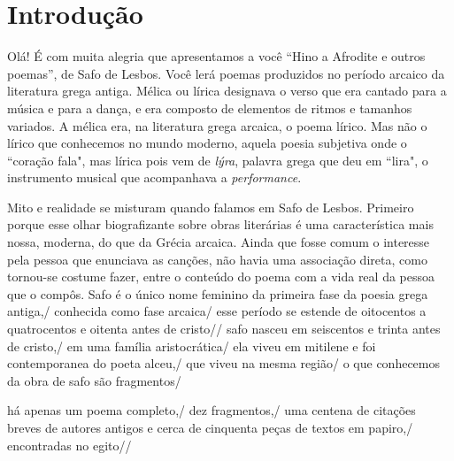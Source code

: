 \documentclass[12pt]{extarticle}
\begin{document}
\section{Introdução}

Olá! 
É com muita alegria que apresentamos a você “Hino a Afrodite e outros poemas”, 
de Safo de Lesbos. 
Você lerá poemas produzidos no período arcaico da literatura grega antiga.
Mélica ou lírica designava o verso que era cantado para a música e para a 
dança, e era composto de elementos de ritmos e tamanhos variados. A mélica era, 
na literatura grega arcaica, o poema lírico. Mas não o lírico que conhecemos no
mundo moderno, aquela poesia subjetiva onde o ``coração fala", mas lírica
pois vem de \textit{lýra}, palavra grega que deu em ``lira", o instrumento musical
que acompanhava a \textit{performance}.

Mito e realidade se misturam quando falamos em Safo de Lesbos. Primeiro porque
esse olhar biografizante sobre obras literárias é uma característica mais nossa,
moderna, do que da Grécia arcaica. Ainda que fosse comum o interesse pela pessoa
que enunciava as canções, não havia uma associação direta, como tornou-se costume
fazer, entre o conteúdo do poema com a vida real da pessoa que o compôs.
Safo é o único nome feminino da primeira fase da poesia grega antiga,/ conhecida como fase arcaica/
esse período se estende de oitocentos a quatrocentos e oitenta antes de cristo//
safo nasceu em seiscentos e trinta antes de cristo,/ em uma família aristocrática/
ela viveu em mitilene e foi contemporanea do poeta alceu,/ que viveu na mesma região/
o que conhecemos da obra de safo são fragmentos/

há apenas um poema completo,/ dez fragmentos,/ uma centena de citações breves de autores antigos e cerca de cinquenta peças de textos em papiro,/ encontradas no egito//
\end{document}
